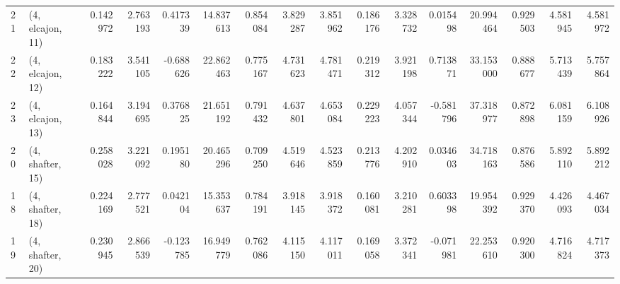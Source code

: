 \begin{tabular}{llrrrrrrrrrrrrrr}
21 &  (4, elcajon, 11) &   0.142972 &  2.763193 &  0.417339 &  14.837613 &  0.854084 &   3.829287 &  3.851962 &  0.186176 &   3.328732 &  0.015498 &   20.994464 &  0.929503 &   4.581945 &   4.581972 \\
22 &  (4, elcajon, 12) &   0.183222 &  3.541105 & -0.688626 &  22.862463 &  0.775167 &   4.731623 &  4.781471 &  0.219312 &   3.921198 &  0.713871 &   33.153000 &  0.888677 &   5.713439 &   5.757864 \\
23 &  (4, elcajon, 13) &   0.164844 &  3.194695 &  0.376825 &  21.651192 &  0.791432 &   4.637801 &  4.653084 &  0.229223 &   4.057344 & -0.581796 &   37.318977 &  0.872898 &   6.081159 &   6.108926 \\
20 &  (4, shafter, 15) &   0.258028 &  3.221092 &  0.195180 &  20.465296 &  0.709250 &   4.519646 &  4.523859 &  0.213776 &   4.202910 &  0.034603 &   34.718163 &  0.876586 &   5.892110 &   5.892212 \\
18 &  (4, shafter, 18) &   0.224169 &  2.777521 &  0.042104 &  15.353637 &  0.784191 &   3.918145 &  3.918372 &  0.160081 &   3.210281 &  0.603398 &   19.954392 &  0.929370 &   4.426093 &   4.467034 \\
19 &  (4, shafter, 20) &   0.230945 &  2.866539 & -0.123785 &  16.949779 &  0.762086 &   4.115150 &  4.117011 &  0.169058 &   3.372341 & -0.071981 &   22.253610 &  0.920300 &   4.716824 &   4.717373 \\
\bottomrule
\end{tabular}
